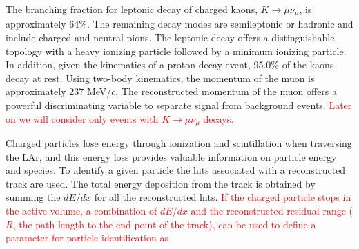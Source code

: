 
The branching fraction for leptonic decay of charged kaons, $K\rightarrow \mu \nu_{\mu}$, is approximately 64$\%$. The remaining decay modes are semileptonic or hadronic and include charged and neutral pions. The leptonic decay offers a distinguishable topology with a heavy ionizing particle followed by a minimum ionizing particle. In addition, given the kinematics of a proton decay event, 95.0$\%$ of the kaons decay at rest. Using two-body kinematics, the momentum of the muon is approximately 237 MeV/$c$. The reconstructed momentum of the muon offers a powerful discriminating variable to separate signal from background events. \textcolor{red}{Later on we will consider only events with $K\rightarrow \mu \nu_{\mu}$ decays.}

Charged particles lose energy through ionization and scintillation when traversing the LAr, and this energy loss provides valuable information on particle energy and species. To identify a given particle the hits associated with a reconstructed track are used.
The total energy deposition from the track is obtained by summing the $dE/dx$ for all the reconstructed hits. 
\textcolor{red}{If the charged particle stops in the \lartpc active volume, a combination of $dE/dx$ and the reconstructed residual range ($R$, the path length to the end point of the track), can be used to define a parameter for particle identification as}


